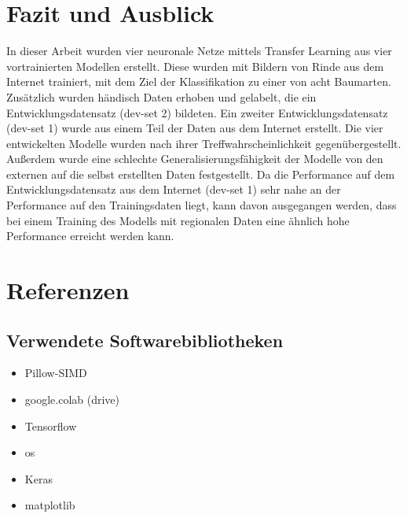 \documentclass{article}
\begin{document}
\FloatBarrier

\section{Fazit und Ausblick}

In dieser Arbeit wurden vier neuronale Netze mittels Transfer Learning aus vier vortrainierten Modellen erstellt. 
Diese wurden mit Bildern von Rinde aus dem Internet trainiert, 
mit dem Ziel der Klassifikation zu einer von acht Baumarten. 
Zusätzlich wurden händisch Daten erhoben und gelabelt, die ein Entwicklungsdatensatz (dev-set 2) bildeten. 
Ein zweiter Entwicklungsdatensatz (dev-set 1) wurde aus einem Teil der Daten aus dem Internet erstellt. 
Die vier entwickelten Modelle wurden nach ihrer Treffwahrscheinlichkeit gegenübergestellt. 
Außerdem wurde eine schlechte Generalisierungsfähigkeit der Modelle von den externen auf die selbst erstellten Daten festgestellt.
Da die Performance auf dem Entwicklungsdatensatz aus dem Internet (dev-set 1) 
sehr nahe an der Performance auf den Trainingsdaten liegt, 
kann davon ausgegangen werden, 
dass bei einem Training des Modells mit regionalen Daten 
eine ähnlich hohe Performance erreicht werden kann.

\section*{Referenzen}
\subsection*{Verwendete Softwarebibliotheken}
\begin{itemize}
\item Pillow-SIMD
\item google.colab (drive)
\item Tensorflow
\item os
\item Keras
\item matplotlib
\end{itemize}

\medskip
\small

\printbibliography[heading=none]
\end{document}
